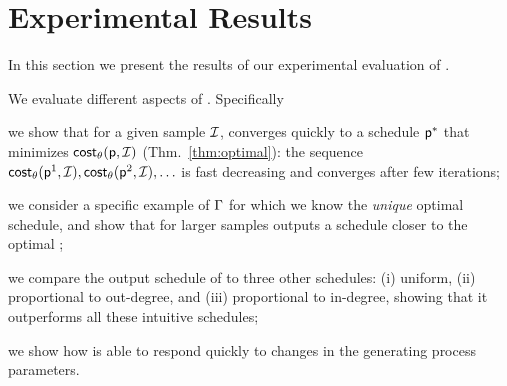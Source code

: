 \section{Experimental Results}\label{sec:exp}
In this section we present the results of our experimental evaluation of
\algonameapx.

 We evaluate different aspects of \algonameapx. Specifically
\begin{enumerate*}
	\item we show that for a given sample $\mathcal{I}$, \algonameapx converges
		quickly to a schedule $\mathsf{p}^*$ that minimizes
		$\mathsf{cost}_\theta(\mathsf{p},\mathcal{I})$ (Thm.~\ref{thm:optimal}): the sequence
		$\mathsf{cost}_\theta(\mathsf{p}^1,\mathcal{I}), \mathsf{cost}_\theta(\mathsf{p}^2, \mathcal{I}),
		\ldots$ is fast decreasing and converges after few iterations;
	\item we consider a specific example of $\Gamma$ for which we know the
		\emph{unique} optimal schedule, and show that for larger samples
		\algonameapx outputs a schedule closer to the optimal
		;
	\item we compare the output schedule of \algonameapx to three other
		schedules: (i) uniform, (ii) proportional to out-degree, and (iii)
		proportional to in-degree, showing that it outperforms all these
		intuitive schedules;
	\item we show how \algonameapx is able to respond quickly to changes in the
		generating process parameters.
\end{enumerate*}



